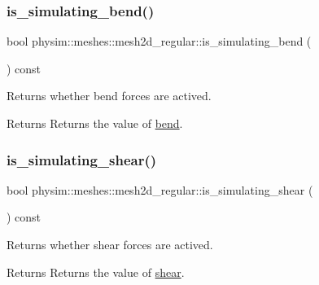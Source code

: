 \subsubsection{\texorpdfstring{is\+\_\+simulating\+\_\+bend()}{is\_simulating\_bend()}}
{\footnotesize\ttfamily bool physim\+::meshes\+::mesh2d\+\_\+regular\+::is\+\_\+simulating\+\_\+bend (\begin{DoxyParamCaption}{ }\end{DoxyParamCaption}) const}



Returns whether bend forces are actived. 

\begin{DoxyReturn}{Returns}
Returns the value of \hyperlink{classphysim_1_1meshes_1_1mesh2d__regular_ab031a8ece45555e421c031b7c3fff4bd}{bend}. 
\end{DoxyReturn}
\mbox{\label{classphysim_1_1meshes_1_1mesh2d__regular_a1620fec743604c7a9dd8b8c81344b615}} 
\subsubsection{\texorpdfstring{is\+\_\+simulating\+\_\+shear()}{is\_simulating\_shear()}}
{\footnotesize\ttfamily bool physim\+::meshes\+::mesh2d\+\_\+regular\+::is\+\_\+simulating\+\_\+shear (\begin{DoxyParamCaption}{ }\end{DoxyParamCaption}) const}



Returns whether shear forces are actived. 

\begin{DoxyReturn}{Returns}
Returns the value of \hyperlink{classphysim_1_1meshes_1_1mesh2d__regular_af25bf35485aa0a40e21a10f4e472721a}{shear}. 
\end{DoxyReturn}
\mbox{\label{classphysim_1_1meshes_1_1mesh2d__regular_ad1674ad6c5d8d3ed7ec01767f63f2de5}} 
